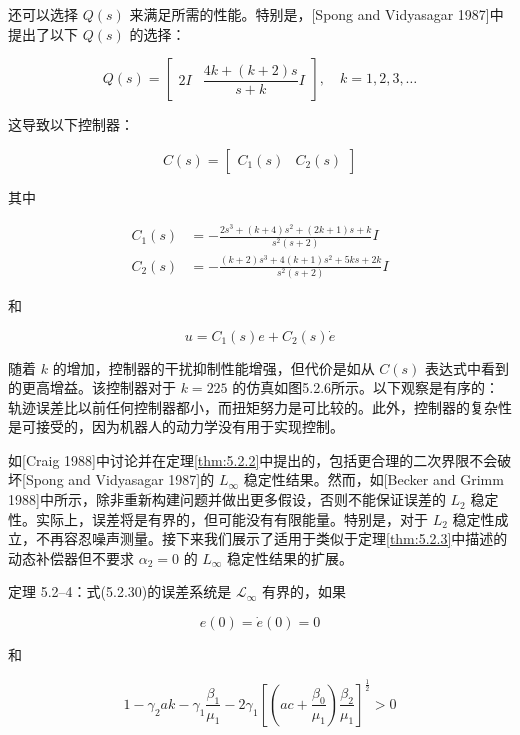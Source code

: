 \documentclass[UTF8,12pt,a4paper]{ctexart}
\begin{document}
\begin{example}
还可以选择 $Q(s)$ 来满足所需的性能。特别是，[Spong and Vidyasagar 1987]中提出了以下 $Q(s)$ 的选择：

\begin{equation*}
Q(s) = \begin{bmatrix} 2I & \dfrac{4k+(k+2)s}{s+k}I \end{bmatrix}, \quad k=1,2,3,\ldots
\end{equation*}

这导致以下控制器：

\begin{equation*}
C(s) = \begin{bmatrix} C_1(s) & C_2(s) \end{bmatrix}
\end{equation*}

其中

\begin{align*}
C_1(s) &= -\frac{2s^3+(k+4)s^2+(2k+1)s+k}{s^2(s+2)}I \\
C_2(s) &= -\frac{(k+2)s^3+4(k+1)s^2+5ks+2k}{s^2(s+2)}I
\end{align*}

和

\begin{equation*}
u = C_1(s)e + C_2(s)\dot{e}
\end{equation*}

随着 $k$ 的增加，控制器的干扰抑制性能增强，但代价是如从 $C(s)$ 表达式中看到的更高增益。该控制器对于 $k = 225$ 的仿真如图5.2.6所示。以下观察是有序的：轨迹误差比以前任何控制器都小，而扭矩努力是可比较的。此外，控制器的复杂性是可接受的，因为机器人的动力学没有用于实现控制。
\end{example}

如[Craig 1988]中讨论并在定理\ref{thm:5.2.2}中提出的，包括更合理的二次界限不会破坏[Spong and Vidyasagar 1987]的 $L_\infty$ 稳定性结果。然而，如[Becker and Grimm 1988]中所示，除非重新构建问题并做出更多假设，否则不能保证误差的 $L_2$ 稳定性。实际上，误差将是有界的，但可能没有有限能量。特别是，对于 $L_2$ 稳定性成立，不再容忍噪声测量。接下来我们展示了适用于类似于定理\ref{thm:5.2.3}中描述的动态补偿器但不要求 $\alpha_2 = 0$ 的 $L_\infty$ 稳定性结果的扩展。

\begin{theorem}\label{thm:5.2.4}
定理 5.2--4：式(5.2.30)的误差系统是 $\mathcal{L}_\infty$ 有界的，如果

\begin{equation}
e(0) = \dot{e}(0) = 0
\end{equation}

和

\begin{equation}
1 - \gamma_2 ak - \gamma_1\frac{\beta_1}{\mu_1} - 2\gamma_1\left[\left(ac + \frac{\beta_0}{\mu_1}\right)\frac{\beta_2}{\mu_1}\right]^{\frac{1}{2}} > 0
\end{equation}
\end{theorem}
\end{document}
